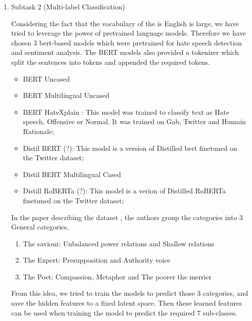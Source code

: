 \documentclass[11pt]{article}
\begin{document}
\begin{enumerate}
	\item Subtask 2 (Multi-label Classification)

	      Considering the fact that the vocabulary of the is English is large,
	      we have tried to leverage the power of pretrained language models.
	      Therefore we have chosen 3 bert-based models which were pretrained
	      for hate speech detection and sentiment analysis. The BERT models
	      also provided a tokenizer which split the sentences into tokens and
	      appended the required tokens.

	      \begin{itemize}
		      \item BERT \cite{bert} Uncased

		      \item  BERT Multilingual Uncased

		      \item BERT HateXplain \cite{mathew2020hatexplain}: This model was trained to classify text as Hate speech, Offensive or Normal.
		            It was trained on Gab, Twitter and Humain Rationale;

		      \item Distil BERT (?): This model is a version of Distilled bert finetuned on the Twitter dataset;

		      \item Distil BERT Multilingual Cased \cite{DistilBERT}

		      \item Distill RoBERTa (?): This model is a verion of Distilled RoBERTa finetuned on the Twitter dataset;
	      \end{itemize}

	      In the paper describing the dataset \cite{perezalmendros2020dont},
	      the authors group the categories into 3 General categories.

	      \begin{enumerate}
		      \item The saviour: Unbalanced power relations and Shallow relations

		      \item  The Expert: Presupposition and Authority voice

		      \item The Poet: Compassion, Metaphor and The poorer the merrier

	      \end{enumerate}

	      From this idea, we tried to train the models to predict those 3
	      categories, and save the hidden features to a fixed latent space.
	      Then these learned features can be used when training the model to
	      predict the required 7 sub-classes.


\end{enumerate}
\end{document}
